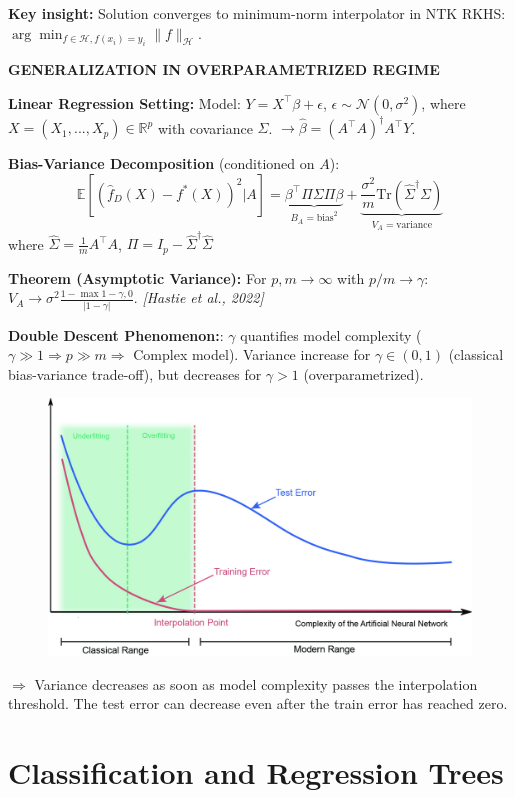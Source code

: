 \documentclass[a4paper,10pt]{article}
\def\R{\mathbb{R}}
\newcommand{\subtitle}[1]{\vspace{0.25cm}\begin{normalsize}\textbf{\textcolor{gray!150}{\uppercase{#1}}}\end{normalsize}}
\begin{document}
\begin{small}
\textbf{Key insight:} Solution converges to minimum-norm interpolator in NTK RKHS:
$\arg\min_{f \in \mathcal{H}, f(x_i)=y_i} \|f\|_{\mathcal{H}}$.

\subtitle{Generalization in Overparametrized Regime}

\textbf{Linear Regression Setting:}
Model: $Y = X^\top\beta + \epsilon$, $\epsilon \sim \mathcal{N}(0,\sigma^2)$, where $X=(X_1,...,X_p) \in \R^p$ with covariance $\Sigma$. $\rightarrow \hat{\beta} = (A^\top A)^\dagger A^\top Y$.

\textbf{Bias-Variance Decomposition} (conditioned on $A$):
$$\mathbb{E}[(\hat{f}_D(X) - f^*(X))^2|A] = \underbrace{\beta^\top\Pi\Sigma\Pi\beta}_{B_A=\text{bias}^2} + \underbrace{\frac{\sigma^2}{m}\text{Tr}(\hat{\Sigma}^\dagger\Sigma)}_{V_A=\text{variance}}$$
where $\hat{\Sigma} = \frac{1}{m}A^\top A$, $\Pi = I_p - \hat{\Sigma}^\dagger\hat{\Sigma}$

\textbf{Theorem (Asymptotic Variance):}
For $p,m\to\infty$ with $p/m\to\gamma$:
$V_A \to \sigma^2\frac{1-\max{1-\gamma,0}}{|1-\gamma|}$. \textit{[Hastie et al., 2022]}

\textbf{Double Descent Phenomenon:}: $\gamma$ quantifies model complexity ($\gamma \gg 1 \Rightarrow p \gg m \Rightarrow $ Complex model). Variance increase for $\gamma \in (0,1)$ (classical bias-variance trade-off), but decreases for $\gamma > 1$ (overparametrized).

\begin{figure}[H]
    \centering
    \includegraphics[width=0.8\linewidth]{figures/double_descent_curve.jpg}
\end{figure}

$\Rightarrow$ Variance decreases as soon as model complexity passes the interpolation threshold. The test error can decrease even after the train error has reached zero.

\section{Classification and Regression Trees}

\end{small}
\end{document}
